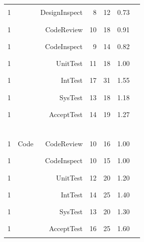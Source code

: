 \documentclass[smallcondensed]{svjour3}
\begin{document}
\begin{figure}
\begin{center}
\begin{tabular}{c|lr|rr|rl}
1 &   &   DesignInspect   & 8 &   12 & 0.73 & \textcolor{black}{\rule{7mm}{2mm}}  \\
1 &   &   CodeReview      & 10 &   18 & 0.91 & \textcolor{black}{\rule{9mm}{2mm}}  \\
1 &   &   CodeInspect     & 9 &  14 & 0.82 & \textcolor{black}{\rule{8mm}{2mm}}  \\
1 &   &   UnitTest        & 11 &   18 & 1.00 & \textcolor{black}{\rule{10mm}{2mm}}  \\
1 &   &   IntTest         & 17 &   31 & 1.55 & \textcolor{black}{\rule{15mm}{2mm}}  \\
1 &   &   SysTest         & 13 &   18 & 1.18 & \textcolor{black}{\rule{12mm}{2mm}}  \\
1 &   &   AcceptTest      & 14 &   19 & 1.27 & \textcolor{black}{\rule{12mm}{2mm}}  \\
\hline\multicolumn{7}{c}{~}  \\
1 &  Code   &   CodeReview    & 10 &  16 & 1.00 & \textcolor{black}{\rule{10mm}{2mm}}  \\
1 &    &   CodeInspect   & 10 &   15 & 1.00 & \textcolor{black}{\rule{10mm}{2mm}}  \\
1 &   &   UnitTest      & 12 &   20 & 1.20 & \textcolor{black}{\rule{12mm}{2mm}}  \\
1 &    &   IntTest       & 14 &   25 & 1.40 & \textcolor{black}{\rule{14mm}{2mm}}  \\
1 &   &   SysTest       & 13 &   20 & 1.30 & \textcolor{black}{\rule{13mm}{2mm}}  \\
1 &    &   AcceptTest    & 16 &   25 & 1.60 & \textcolor{black}{\rule{16mm}{2mm}}  \\


\end{tabular}
\end{center}
\end{figure}
\end{document}
